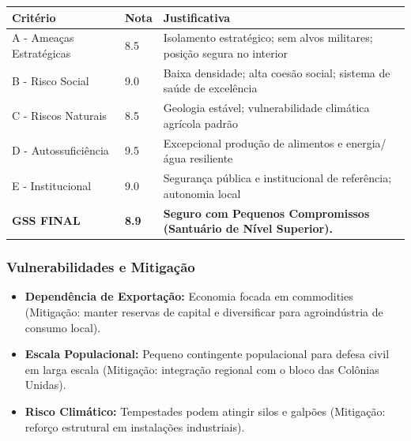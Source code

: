 \begin{table}[ht!]
\small \begin{tabular}{p{3.0cm}p{0.8cm}p{6.0cm}} \toprule
\textbf{Critério} & \textbf{Nota} & \textbf{Justificativa} \\ \midrule
A - Ameaças Estratégicas & 8.5 & Isolamento estratégico; sem alvos militares; posição segura no interior \\
B - Risco Social & 9.0 & Baixa densidade; alta coesão social; sistema de saúde de excelência \\
C - Riscos Naturais & 8.5 & Geologia estável; vulnerabilidade climática agrícola padrão \\
D - Autossuficiência & 9.5 & Excepcional produção de alimentos e energia/\allowbreak água resiliente \\
E - Institucional & 9.0 & Segurança pública e institucional de referência; autonomia local \\
\midrule \textbf{GSS FINAL} & \textbf{8.9} & \textbf{Seguro com Pequenos Compromissos (Santuário de Nível Superior).} \\ \bottomrule \end{tabular}
\end{table}
\subsubsection{Vulnerabilidades e
Mitigação}

\begin{itemize}
\tightlist
\item
  \textbf{Dependência de Exportação:} Economia focada em commodities
  (Mitigação: manter reservas de capital e diversificar para
  agroindústria de consumo local).
\item
  \textbf{Escala Populacional:} Pequeno contingente populacional para
  defesa civil em larga escala (Mitigação: integração regional com o
  bloco das Colônias Unidas).
\item
  \textbf{Risco Climático:} Tempestades podem atingir silos e galpões
  (Mitigação: reforço estrutural em instalações industriais).
\end{itemize}

